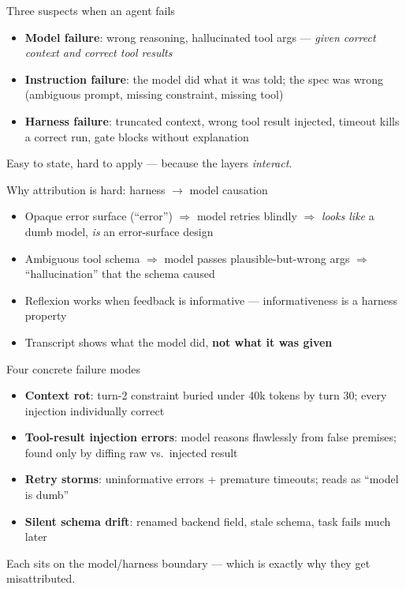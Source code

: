 \documentclass[aspectratio=169,11pt]{beamer}
\begin{document}
\begin{frame}{Three suspects when an agent fails}
\begin{itemize}
\item \textbf{Model failure}: wrong reasoning, hallucinated tool args --- \emph{given correct context and correct tool results}
\item \textbf{Instruction failure}: the model did what it was told; the spec was wrong (ambiguous prompt, missing constraint, missing tool)
\item \textbf{Harness failure}: truncated context, wrong tool result injected, timeout kills a correct run, gate blocks without explanation
\end{itemize}

\vspace{0.5em}
Easy to state, hard to apply --- because the layers \emph{interact}.
\end{frame}

\begin{frame}{Why attribution is hard: harness $\to$ model causation}
\begin{itemize}
\item Opaque error surface (``error'') $\Rightarrow$ model retries blindly $\Rightarrow$ \emph{looks like} a dumb model, \emph{is} an error-surface design
\item Ambiguous tool schema $\Rightarrow$ model passes plausible-but-wrong args $\Rightarrow$ ``hallucination'' that the schema caused
\item Reflexion works when feedback is informative \cite{shinn2023reflexion} --- informativeness is a harness property
\item Transcript shows what the model did, \textbf{not what it was given}
\end{itemize}
\end{frame}

\begin{frame}{Four concrete failure modes}
\begin{itemize}
\item \textbf{Context rot}: turn-2 constraint buried under 40k tokens by turn 30; every injection individually correct
\item \textbf{Tool-result injection errors}: model reasons flawlessly from false premises; found only by diffing raw vs.\ injected result
\item \textbf{Retry storms}: uninformative errors + premature timeouts; reads as ``model is dumb''
\item \textbf{Silent schema drift}: renamed backend field, stale schema, task fails much later
\end{itemize}

\vspace{0.5em}
Each sits on the model/harness boundary --- which is exactly why they get misattributed.
\end{frame}
\end{document}
